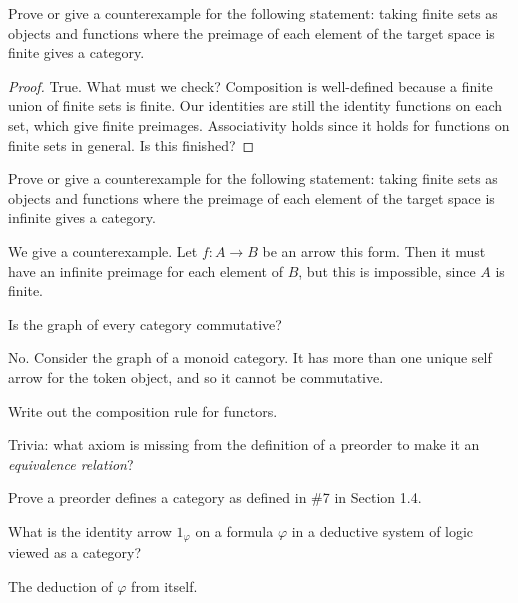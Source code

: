 \documentclass[12pt, reqno]{amsart}
\theoremstyle{definition}
\theoremstyle{definition}
\numberwithin{theorem}{section}
\theoremstyle{plain}
\theoremstyle{definition}
\theoremstyle{remark}
\renewcommand{\'}{\hspace{0.5mm}'}			%
\let\phi\varphi
\begin{document}
\begin{e}
	Prove or give a counterexample for the following statement: taking finite sets as objects and functions where the preimage of each element of the target space is finite gives a category. 
\end{e}

\begin{proof}
	True. What must we check? Composition is well-defined because a finite union of finite sets is finite. Our identities are still the identity functions on each set, which give finite preimages. Associativity holds since it holds for functions on finite sets in general. Is this finished?
\end{proof}

\begin{e}
	Prove or give a counterexample for the following statement: taking finite sets as objects and functions where the preimage of each element of the target space is infinite gives a category. 
\end{e}

We give a counterexample. Let $f:A \to B$ be an arrow this form. Then it must have an infinite preimage for each element of $B$, but this is impossible, since $A$ is finite. 

\begin{e}
	Is the graph of every category commutative?
\end{e}

No. Consider the graph of a monoid category. It has more than one unique self arrow for the token object, and so it cannot be commutative. 

\begin{e}
	Write out the composition rule for functors. 
\end{e}

\begin{e}
	Trivia: what axiom is missing from the definition of a preorder to make it an \textit{equivalence relation}?
\end{e}

\begin{e}
	Prove a preorder defines a category as defined in \#7 in Section 1.4. 
\end{e}

\begin{e}
	What is the identity arrow $1_\phi$ on a formula $\phi$ in a deductive system of logic viewed as a category?
\end{e}

 The deduction of $\phi$ from itself. 
 
\end{document}

